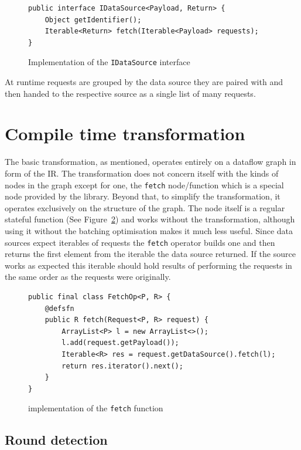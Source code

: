 \begin{figure}[h]
\begin{verbatim}
public interface IDataSource<Payload, Return> {
    Object getIdentifier();
    Iterable<Return> fetch(Iterable<Payload> requests);
}
\end{verbatim}
\caption{Implementation of the \texttt{IDataSource} interface}
\label{fig:idatasource-interface-implementation}
\end{figure}

At runtime requests are grouped by the data source they are paired with and then handed to the respective source as a single list of many requests.

\section{Compile time transformation}

The basic \yauhau{} transformation, as mentioned, operates entirely on a dataflow graph in form of the IR.
The transformation does not concern itself with the kinds of nodes in the graph except for one, the \texttt{fetch} node/function which is a special node provided by the \yauhau{} library.
Beyond that, to simplify the transformation, it operates exclusively on the structure of the graph.
The \fetch{} node itself is a regular stateful function (See Figure~\ref{fig:fetch-implementation}) and works without the \yauhau{} transformation, although using it without the batching optimisation makes it much less useful.
Since data sources expect iterables of requests the \texttt{fetch} operator builds one and then returns the first element from the iterable the data source returned.
If the source works as expected this iterable should hold results of performing the requests in the same order as the requests were originally.

\begin{figure}[h]
\begin{verbatim}
public final class FetchOp<P, R> {
    @defsfn
    public R fetch(Request<P, R> request) {
        ArrayList<P> l = new ArrayList<>();
        l.add(request.getPayload());
        Iterable<R> res = request.getDataSource().fetch(l);
        return res.iterator().next();
    }
}
\end{verbatim}
\caption{implementation of the \texttt{fetch} function}
\label{fig:fetch-implementation}
\end{figure}

\subsection{Round detection}

